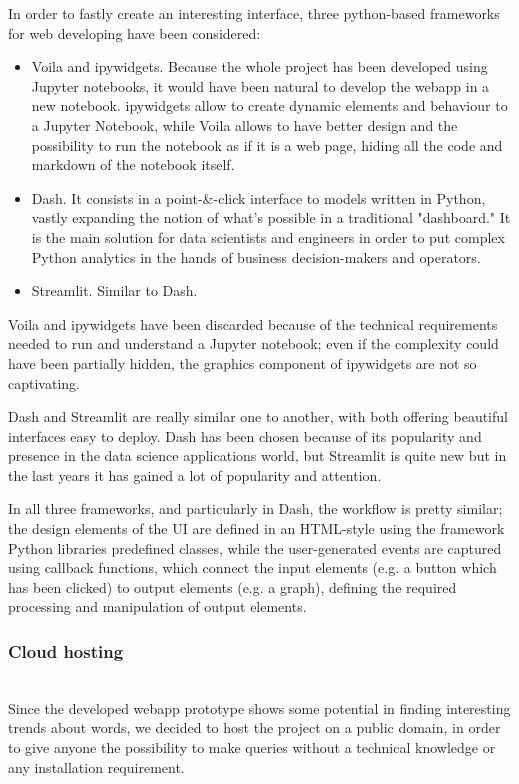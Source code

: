 In order to fastly create an interesting interface, three python-based frameworks for web developing have been considered:
\begin{itemize}
    \item Voila and ipywidgets. Because the whole project has been developed using Jupyter notebooks, it would have
    been natural to develop the webapp in a new notebook. ipywidgets allow to create dynamic elements and behaviour to
    a Jupyter Notebook, while Voila allows to have better design and the possibility to run the notebook as if it is
    a web page, hiding all the code and markdown of the notebook itself.
    \item Dash. It consists in a point-\&-click interface to models written in Python, vastly expanding the notion of
    what's possible in a traditional "dashboard." It is the main solution for data scientists and engineers in order to
    put complex Python analytics in the hands of business decision-makers and operators.
    \item Streamlit. Similar to Dash.
\end{itemize}
Voila and ipywidgets have been discarded because of the technical requirements needed to run and understand a Jupyter
notebook; even if the complexity could have been partially hidden, the graphics component of ipywidgets are not so
captivating.

Dash and Streamlit are really similar one to another, with both offering beautiful interfaces easy to deploy. Dash has
been chosen because of its popularity and presence in the data science applications world, but Streamlit is quite new
but in the last years it has gained a lot of popularity and attention.

In all three frameworks, and particularly in Dash, the workflow is pretty similar; the design elements of the UI are
defined in an HTML-style using the framework Python libraries predefined classes, while the user-generated events are
captured using callback functions, which connect the input elements (e.g. a button which has been clicked) to output
elements (e.g. a graph), defining the required processing and manipulation of output elements.

\subsubsection{Cloud hosting}\hfill\\

Since the developed webapp prototype shows some potential in finding interesting trends about words, we 
decided to host the project on a public domain, in order to give anyone the possibility to make queries 
without a technical knowledge or any installation requirement.

